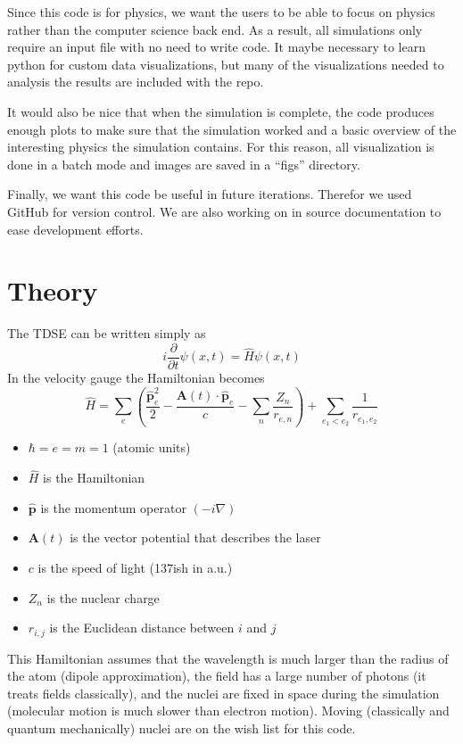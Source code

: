 \documentclass{article}
\begin{document}
Since this code is for physics, we want the users to be able to focus on physics rather than the computer science back end. As a result, all simulations only require an input file with no need to write code. It maybe necessary to learn python for custom data visualizations, but many of the visualizations needed to analysis the results are included with the repo.

It would also be nice that when the simulation is complete, the code produces enough plots to make sure that the simulation worked and a basic overview of the interesting physics the simulation contains. For this reason, all visualization is done in a batch mode and images are saved in a ``figs'' directory.

Finally, we want this code be useful in future iterations. Therefor we used GitHub for version control. We are also working on in source documentation to ease development efforts.

\section{Theory} %
\label{sec:theory}

The TDSE can be written simply as
\begin{equation}
    i\frac{\partial}{\partial t}\psi(x,t) = \hat{H}\psi(x,t)
\end{equation}
In the velocity gauge the Hamiltonian becomes
\begin{equation}
    \label{eq:atoms_and_molecules}
    \hat{H} = \sum_{e}\left(\frac{\hat{\mathbf{p}}^2_e}{2} - \frac{\mathbf{A}(t) \cdot \hat{\mathbf{p}}_e}{c} - \sum_{n} \frac{Z_n}{r_{e,n}}\right) + \sum_{e_1 < e_2}\frac{1}{r_{e_1, e_2}}
\end{equation}
\begin{itemize}
    \item $\hbar=e=m=1$ (atomic units)
    \item $\hat{H}$ is the Hamiltonian
    \item $\hat{\mathbf{p}}$ is the momentum operator $(-i\nabla)$
    \item $\mathbf{A}(t)$ is the vector potential that describes the laser
    \item $c$ is the speed of light (137ish in a.u.)
    \item $Z_n$ is the nuclear charge
    \item $r_{i,j}$ is the Euclidean distance between $i$ and $j$
\end{itemize}
This Hamiltonian assumes that the wavelength is much larger than the radius of the atom (dipole approximation), the field has a large number of photons (it treats fields classically), and the nuclei are fixed in space during the simulation (molecular motion is much slower than electron motion). Moving (classically and quantum mechanically) nuclei are on the wish list for this code.
\end{document}
